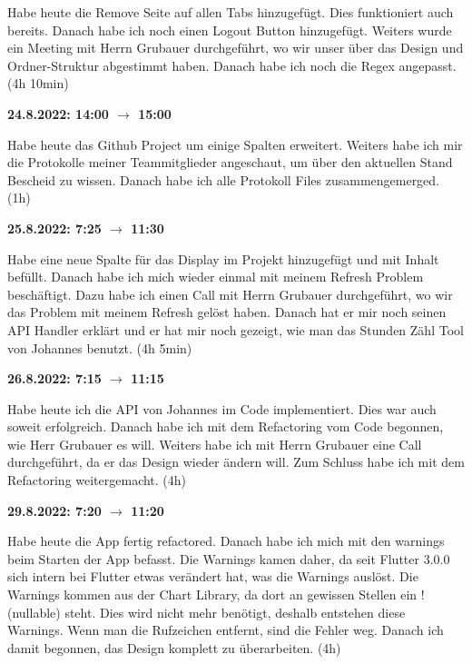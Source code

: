 Habe heute die Remove Seite auf allen Tabs hinzugefügt. Dies funktioniert auch bereits. Danach habe ich noch einen Logout Button hinzugefügt. Weiters wurde
ein Meeting mit Herrn Grubauer durchgeführt, wo wir unser über das Design und Ordner-Struktur abgestimmt haben. Danach habe ich noch die Regex angepasst. (4h 10min)

\vspace{0.5cm}

\textbf{24.8.2022: 14:00 $\rightarrow$ 15:00} \

Habe heute das Github Project um einige Spalten erweitert. Weiters habe ich mir die Protokolle meiner Teammitglieder angeschaut, um über den aktuellen Stand Bescheid zu wissen. Danach habe ich alle Protokoll Files zusammengemerged. (1h)

\vspace{0.5cm}

\textbf{25.8.2022: 7:25 $\rightarrow$ 11:30} \

Habe eine neue Spalte für das Display im Projekt hinzugefügt und mit Inhalt befüllt. Danach habe ich mich wieder einmal mit meinem Refresh Problem beschäftigt. Dazu habe ich einen Call mit Herrn Grubauer durchgeführt, wo wir das Problem mit meinem Refresh gelöst haben. Danach hat er mir noch seinen API Handler erklärt und er hat mir noch gezeigt, wie man das Stunden Zähl Tool von Johannes benutzt. (4h 5min)

\vspace{0.5cm}

\textbf{26.8.2022: 7:15 $\rightarrow$ 11:15} \

Habe heute ich die API von Johannes im Code implementiert. Dies war auch soweit erfolgreich. Danach habe ich mit dem Refactoring vom Code begonnen, wie Herr Grubauer es will. Weiters habe ich mit Herrn Grubauer eine Call durchgeführt, da er das Design wieder ändern will. Zum Schluss habe ich mit dem Refactoring weitergemacht. (4h)

\vspace{0.5cm}

\textbf{29.8.2022: 7:20 $\rightarrow$ 11:20} \

Habe heute die App fertig refactored. Danach habe ich mich mit den warnings beim Starten der App befasst. Die Warnings kamen daher, da seit Flutter 3.0.0 sich intern bei Flutter etwas verändert hat, was die Warnings auslöst. Die Warnings kommen aus der Chart Library, da dort an gewissen Stellen ein !(nullable) steht. Dies wird nicht mehr benötigt, deshalb entstehen diese Warnings. Wenn man die Rufzeichen entfernt, sind die Fehler weg. Danach ich damit begonnen, das Design komplett zu überarbeiten. (4h)

